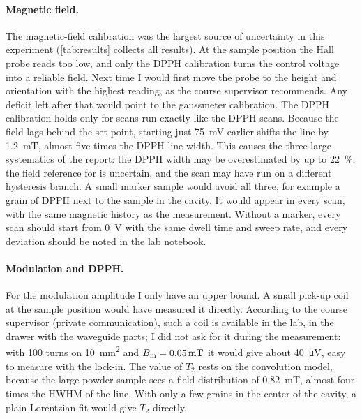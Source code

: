\paragraph{Magnetic field.}
The magnetic-field calibration was the largest source of uncertainty in this experiment (\cref{tab:results} collects
all results). At the sample position the Hall probe reads too low, and only the DPPH calibration turns the control voltage into a
reliable field. Next time I would first move the probe to the height and orientation with the highest reading, as the
course supervisor recommends. Any deficit left after that would point to the gaussmeter calibration. The DPPH
calibration holds only for scans run exactly like the DPPH scans. Because the field lags behind the set point, starting
just \qty{75}{mV} earlier shifts the line by \qty{1.2}{mT}, almost five times the DPPH line width. This
causes the three large systematics of the report: the DPPH width may be overestimated by up to \qty{22}{\percent}, the
field reference for  is uncertain, and the  scan may have run on a different hysteresis branch. A
small marker sample would avoid all three, for example a grain of DPPH next to the sample in the cavity. It would appear
in every scan, with the same magnetic history as the measurement. Without a marker, every scan should start from
\qty{0}{V} with the same dwell time and sweep rate, and every deviation should be noted in the lab notebook.

\paragraph{Modulation and DPPH.}
For the modulation amplitude I only have an upper bound. A small pick-up coil at the sample position would have measured
it directly. According to the course supervisor (private communication), such a coil is available in the lab, in the
drawer with the waveguide parts; I did not ask for it during the measurement: with 100 turns on \qty{10}{mm^2} and $B_\mathrm{m}=\qty{0.05}{mT}$ it would give about \qty{40}{\micro V}, easy to
measure with the lock-in. The value of $T_2$ rests on the convolution model, because the large powder sample sees a
field distribution of \qty{0.82}{mT}, almost four times the HWHM of the line. With only a few grains in the center of the
cavity, a plain Lorentzian fit would give $T_2$ directly.

